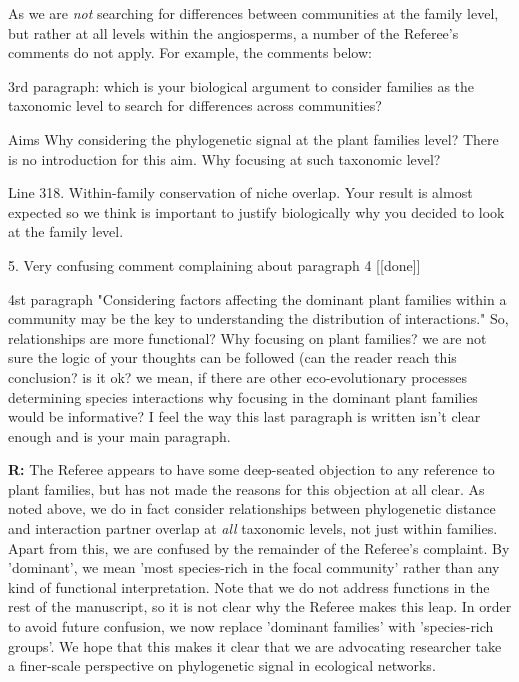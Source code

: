 \documentclass[12pt]{letter}
\newenvironment{refquote}{\bigskip \begin{it}}{\end{it}\smallskip}
\begin{document}
		As we are \emph{not} searching for differences between communities at the family level, but rather at all levels within the angiosperms, a number of the Referee's comments do not apply. For example, the comments below:


		\begin{refquote}
		3rd paragraph:  which is your biological argument to consider families as the taxonomic level to search for differences across communities?
		\end{refquote}


		\begin{refquote}
		Aims
		Why considering the phylogenetic signal at the plant families level? There is no introduction for this aim. Why focusing at such taxonomic level?
		\end{refquote}


		\begin{refquote}
			Line 318. Within-family conservation of niche overlap. Your result is almost expected so we think is important to justify biologically why you decided to look at the family level.
		\end{refquote}


	5. Very confusing comment complaining about paragraph 4 [[done]]

		\begin{refquote}
		4st paragraph "Considering factors affecting the dominant plant families within
		a community may be the key to understanding the distribution of interactions." So, relationships are more functional? Why focusing on plant families? we are not sure the logic of your thoughts can be followed (can the reader reach this conclusion? is it ok? we mean, if there are other eco-evolutionary processes determining species interactions why focusing in the dominant plant families would be informative? I feel the way this last paragraph is written isn't clear enough and is your main paragraph.
		\end{refquote}


		\textbf{R:} The Referee appears to have some deep-seated objection to any reference to plant families, but has not made the reasons for this objection at all clear. As noted above, we do in fact consider relationships between phylogenetic distance and interaction partner overlap at \emph{all} taxonomic levels, not just within families. Apart from this, we are confused by the remainder of the Referee's complaint. By 'dominant', we mean 'most species-rich in the focal community' rather than any kind of functional interpretation. Note that we do not address functions in the rest of the manuscript, so it is not clear why the Referee makes this leap. In order to avoid future confusion, we now replace 'dominant families' with 'species-rich groups'. We hope that this makes it clear that we are advocating researcher take a finer-scale perspective on phylogenetic signal in ecological networks.
\end{document}
